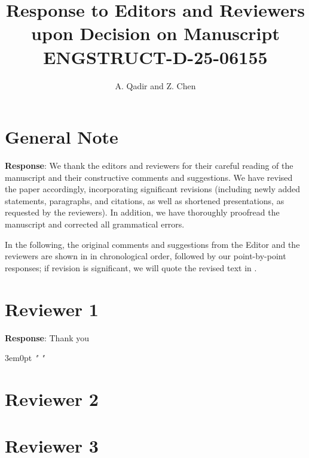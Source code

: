\documentclass[12pt, a4paper]{article}
\newcommand{\BC}[1]{
 \vspace{\baselineskip}%
\noindent \textbf{\color{black}{#1}}
}
\newcommand{\RE}{%
  \vspace{\baselineskip}%
  \textbf{Response}: 
}
\newcommand{\QT}[1]{
\begin{adjustwidth}{3em}{0pt}
\textit{" \color{blue}{#1} "}
\end{adjustwidth}
}
\begin{document}
\title{Response to Editors and Reviewers upon Decision on Manuscript ENGSTRUCT-D-25-06155}
\author{A. Qadir and Z. Chen}
\maketitle

\doublespacing

\section*{General Note}
\RE We thank the editors and reviewers for their careful reading of the manuscript and their constructive comments and suggestions. We have revised the paper accordingly, incorporating significant revisions (including newly added statements, paragraphs, and citations, as well as shortened presentations, as requested by the reviewers). In addition, we have thoroughly proofread the manuscript and corrected all grammatical errors.

In the following, the original comments and suggestions from the Editor and the reviewers are shown in {} in chronological order, followed by our point-by-point responses; if revision is significant, we will quote the revised text in {}.

\newpage

\section*{Reviewer 1}
\BC{xyz}

\RE{Thank you}
\QT{Quoted Texts are here}

\section*{Reviewer 2}
\section*{Reviewer 3}


% 
% 
% 
\end{document}
